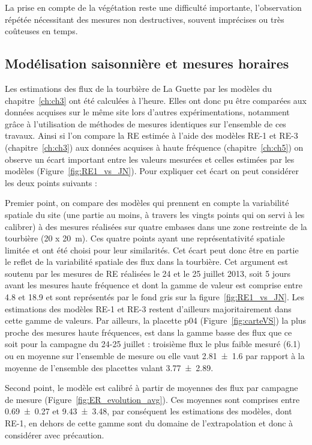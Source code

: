 La prise en compte de la végétation reste une difficulté importante, l'observation répétée nécessitant des mesures non destructives, souvent imprécises ou très coûteuses en temps.


\subsection*{Modélisation saisonnière et mesures horaires}

Les estimations des flux de la tourbière de La Guette par les modèles du chapitre~\ref{ch:ch3} ont été calculées à l'heure.
Elles ont donc pu être comparées aux données acquises sur le même site lors d'autres expérimentations, notamment grâce à l'utilisation de méthodes de mesures identiques sur l'ensemble de ces travaux.
Ainsi si l'on compare la RE estimée à l'aide des modèles RE-1 et RE-3 (chapitre~\ref{ch:ch3}) aux données acquises à haute fréquence (chapitre~\ref{ch:ch5}) on observe un écart important entre les valeurs mesurées et celles estimées par les modèles (Figure~\ref{fig:RE1_vs_JN}).
Pour expliquer cet écart on peut considérer les deux points suivants : 

Premier point, on compare des modèles qui prennent en compte la variabilité spatiale du site (une partie au moins, à travers les vingts points qui on servi à les calibrer) à des mesures réalisées sur quatre embases dans une zone restreinte de la tourbière (20 x \SI{20}{\metre}).
Ces quatre points ayant une représentativité spatiale limitée et ont été choisi pour leur similarités.
Cet écart peut donc être en partie le reflet de la variabilité spatiale des flux dans la tourbière.
Cet argument est soutenu par les mesures de RE réalisées le 24 et le 25 juillet 2013, soit 5 jours avant les mesures haute fréquence et dont la gamme de valeur est comprise entre \num{4.8} et \SI{18.9}{\uml} et sont représentés par le fond gris sur la figure~\ref{fig:RE1_vs_JN}.
Les estimations des modèles RE-1 et RE-3 restent d'ailleurs majoritairement dans cette gamme de valeurs.
Par ailleurs, la placette p04 (Figure~\ref{fig:carteVS}) la plus proche des mesures haute fréquences, est dans la gamme basse des flux que ce soit pour la campagne du 24-25 juillet : troisième flux le plus faible mesuré (\SI{6.1}{\uml}) ou en moyenne sur l'ensemble de mesure ou elle vaut \SI{2.81(160)}{\uml} par rapport à la moyenne de l'ensemble des placettes valant \SI{3.77(289)}{\uml}.

Second point, le modèle est calibré à partir de moyennes des flux par campagne de mesure (Figure~\ref{fig:ER_evolution_avg}).
Ces moyennes sont comprises entre \num{0.69(027)} et \SI{9.43(348)}{\uml}, par conséquent les estimations des modèles, dont RE-1, en dehors de cette gamme sont du domaine de l'extrapolation et donc à considérer avec précaution.

